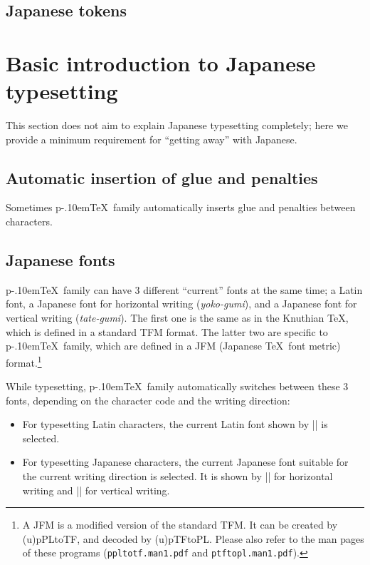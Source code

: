 \documentclass[a4paper,11pt,dvipdfmx]{article}
\def\code#1{\texttt{#1}}
\def\Foreign#1{\textit{#1}}
\def\pTeX{p\kern-.10em\TeX}\def\upTeX{u\pTeX}
\begin{document}
\subsection{Japanese tokens}

\section{Basic introduction to Japanese typesetting}

This section does not aim to explain Japanese typesetting completely;
here we provide a minimum requirement for ``getting away'' with Japanese.

\subsection{Automatic insertion of glue and penalties}

Sometimes \pTeX\ family automatically inserts glue and penalties
between characters.

\subsection{Japanese fonts}

\pTeX\ family can have 3 different ``current'' fonts at the same time;
a Latin font, a Japanese font for horizontal writing (\Foreign{yoko-gumi}),
and a Japanese font for vertical writing (\Foreign{tate-gumi}).
The first one is the same as in the Knuthian \TeX,
which is defined in a standard TFM format.
The latter two are specific to \pTeX\ family, which are defined
in a JFM (Japanese \TeX\ font metric) format.\footnote{%
A JFM is a modified version of the standard TFM.
It can be created by (u)pPLtoTF, and decoded by (u)pTFtoPL.
Please also refer to the man pages of these programs
(\code{ppltotf.man1.pdf} and \code{ptftopl.man1.pdf}).}

While typesetting, \pTeX\ family automatically switches between
these 3 fonts, depending on the character code and the writing direction:
\begin{itemize}
  \item For typesetting Latin characters,
    the current Latin font shown by |\the\font| is selected.
  \item For typesetting Japanese characters,
    the current Japanese font suitable for the current writing direction
    is selected. It is shown by |\the\jfont| for horizontal writing
    and |\the\tfont| for vertical writing.
\end{itemize}
\end{document}
